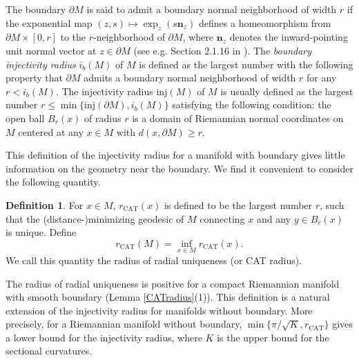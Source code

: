 \documentclass[11pt,letterpaper]{amsart}
\numberwithin{equation}{section}
\theoremstyle{definition}
\theoremstyle{plain}
\theoremstyle{definition}
\newtheorem{Def-CATradius}{Definition}[section]
\theoremstyle{plain}
\theoremstyle{definition}
\theoremstyle{plain}
\begin{document}
The boundary $\partial M$ is said to admit a boundary normal neighborhood of width $r$ if the exponential map $(z,s)\mapsto \exp_z(s\textbf{n}_z)$ defines a homeomorphism from $\partial M\times [0,r]$ to the $r$-neighborhood of $\partial M$, where $\textbf{n}_z$ denotes the inward-pointing unit normal vector at $z\in\partial M$ (see e.g. Section 2.1.16 in \cite{KKL}). The \emph{boundary injectivity radius} $i_b(M)$ of $M$ is defined as the largest number with the following property that $\partial M$ admits a boundary normal neighborhood of width $r$ for any $r<i_b(M)$. The injectivity radius $\textrm{inj}(M)$ of $M$ is usually defined as the largest number $r\leqslant \min\{\textrm{inj}(\partial M),i_b(M)\}$ satisfying the following condition: the open ball $B_{r}(x)$ of radius $r$ is a domain of Riemannian normal coordinates on $M$ centered at any $x\in M$ with $d(x,\partial M)\geqslant r$.

This definition of the injectivity radius for a manifold with boundary gives little information on the geometry near the boundary. We find it convenient to consider the following quantity.

\begin{Def-CATradius}\label{Def-CATradius}
For $x\in M$, $r_{\textrm{CAT}}(x)$ is defined to be the largest number $r$, such that the (distance-)minimizing geodesic of $M$ connecting $x$ and any $y\in B_r(x)$ is unique. Define 
$$r_{\textrm{CAT}}(M)=\inf_{x\in M} r_{\textrm{CAT}}(x).$$
We call this quantity the radius of radial uniqueness (or CAT radius).
\end{Def-CATradius}
The radius of radial uniqueness is positive for a compact Riemannian manifold with smooth boundary (Lemma \ref{CATradius}(1)). This definition is a natural extension of the injectivity radius for manifolds without boundary. More precisely, for a Riemannian manifold without boundary, $\min\{\pi/\sqrt{K},r_{\textrm{CAT}}\}$ gives a lower bound for the injectivity radius, where $K$ is the upper bound for the sectional curvatures.
\end{document}
